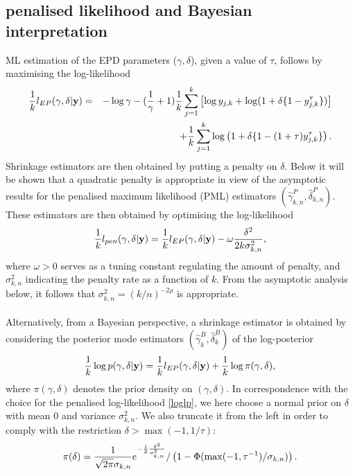 \subsection{penalised likelihood and Bayesian interpretation}
ML estimation of the EPD parameters ($\gamma,\delta$), given a value of $\tau$, follows by maximising the log-likelihood
\begin{eqnarray}
{1 \over k}l_{EP}(\gamma,\delta |{\bf y}) &=& -\log \gamma
-(\frac{1}{\gamma}+1){1 \over k}\sum_{j=1}^k\left[\log y_{j,k} + \log(1+\delta\{1-y_{j,k}^{\tau}\})\right] \nonumber \\&&
+{1 \over k}\sum_{j=1}^k\log\left(1+\delta\{1-(1+\tau)y_{j,k}^{\tau}\}\right).
\label{logl}
\end{eqnarray}
Shrinkage estimators are then obtained by putting a penalty on $\delta$. Below it will be shown that a quadratic penalty is appropriate in view of the asymptotic results for the penalised maximum likelihood (PML) estimators $(\hat{\gamma}_{k,n}^{P},\hat{\delta}^P_{k,n})$. These estimators are then obtained by optimising the log-likelihood
\begin{equation}
{1 \over k}l_{pen} (\gamma,\delta |{\bf y}) = {1 \over k}l_{EP}(\gamma,\delta |{\bf y}) - \omega {\delta^2 \over 2k\sigma_{k,n}^2}, 
\label{loglp}
\end{equation}
where $\omega >0$ serves as a tuning constant regulating the amount of penalty, and $\sigma_{k,n}^2$ indicating the penalty rate as a function of $k$. From the asymptotic analysis below, it follows that $\sigma^2_{k,n} = (k/n)^{-2\rho}$ is appropriate. 
\\\\
Alternatively, from a Bayesian perspective, a shrinkage estimator is obtained by considering the posterior mode estimators $(\hat{\gamma}_k^{B},\hat{\delta}_k^B)$ of the log-posterior
\begin{equation}
{1 \over k} \log p (\gamma,\delta|{\bf y}) = 
{1 \over k}l_{EP}(\gamma,\delta |{\bf y}) + {1 \over k}\log \pi (\gamma,\delta),
\label{logpost}
\end{equation}
where $\pi (\gamma,\delta)$ denotes the prior density on $(\gamma,\delta)$. In correspondence with the choice for the penalised log-likelihood \eqref{loglp}, we here choose a normal prior on $\delta$ with mean 0 and variance $\sigma^2_{k,n}$. We also truncate it from the left in order to comply with the restriction
$\delta > \max (-1,1/\tau)$:
\begin{equation}
\pi (\delta) = {1 \over \sqrt{2\pi}\sigma_{k,n}}e^{-{1 \over 2}{\delta^2 \over \sigma^2_{k,n}}}/ \left( 1-\Phi (\max (-1,\tau^{-1})/\sigma_{k,n})\right).
\label{pidelta}
\end{equation} 

